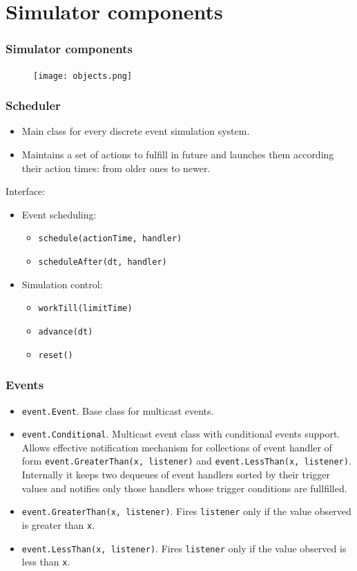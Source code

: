 \documentclass{beamer}
\begin{document}
\section{Simulator components}

\begin{frame}
\frametitle{Simulator components}
\begin{figure}[htbp]
\centering
\texttt{[image: objects.png]}
\end{figure}
\end{frame}

\begin{frame}
\frametitle{Scheduler}
\begin{itemize}
  \item Main class for every discrete event simulation system.
  \item Maintains a set of actions to fulfill in future and launches them according their action times: from older ones to newer.
\end{itemize}
Interface:
\begin{itemize}
  \item Event scheduling:
  \begin{itemize}
    \item \texttt{schedule(actionTime, handler)}
    \item \texttt{scheduleAfter(dt, handler)}
  \end{itemize}
  \item Simulation control:
  \begin{itemize}
    \item \texttt{workTill(limitTime)}
    \item \texttt{advance(dt)}
    \item \texttt{reset()}
  \end{itemize}
\end{itemize}
\end{frame}

\begin{frame}
\frametitle{Events}
\begin{itemize}
  \item \texttt{event.Event}. Base class for multicast events.
  \item \texttt{event.Conditional}. Multicast event class with conditional events support. Allows effective notification mechanism for collections of event handler of form \texttt{event.GreaterThan(x, listener)} and \texttt{event.LessThan(x, listener)}. Internally it keeps two dequeues of event handlers sorted by their trigger values and notifies only those handlers whose trigger conditions are fullfilled.
  \item \texttt{event.GreaterThan(x, listener)}. Fires \texttt{listener} only if the value observed is greater than \texttt{x}.
  \item \texttt{event.LessThan(x, listener)}. Fires \texttt{listener} only if the value observed is less than \texttt{x}.
\end{itemize}
\end{frame}
\end{document}
